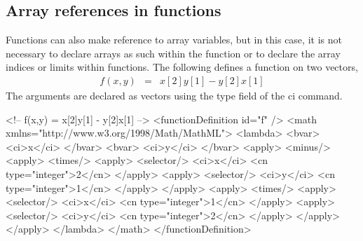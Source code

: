 \subsection{Array references in functions}

Functions can also make reference to array variables, but in this case, it is not necessary to declare arrays as such within the function or to declare the array indices or limits within functions.  The following defines a function on two vectors, 
\begin{eqnarray*}
f(x,y) & = & x[2]y[1] - y[2]x[1]
\end{eqnarray*}
The arguments are declared as vectors using the type field of the ci command.

\begin{example}
<!-- f(x,y) = x[2]y[1] - y[2]x[1] -->
<functionDefinition id="f" />
 <math xmlns="http://www.w3.org/1998/Math/MathML">
  <lambda>
   <bvar>
    <ci>x</ci>
   </bvar>
   <bvar>
    <ci>y</ci>
   </bvar>
   <apply>
     <minus/>
       <apply>
         <times/>
           <apply>
             <selector/>
             <ci>x</ci>
             <cn type="integer">2</cn>
           </apply>
           <apply>
             <selector/>
             <ci>y</ci>
             <cn type="integer">1</cn>
           </apply>
       </apply>
       <apply>
         <times/>
           <apply>
             <selector/>
             <ci>x</ci>
             <cn type="integer">1</cn>
           </apply>
           <apply>
             <selector/>
             <ci>y</ci>
             <cn type="integer">2</cn>
           </apply>
       </apply>
   </apply>
  </lambda>
 </math>
</functionDefinition>
\end{example}
